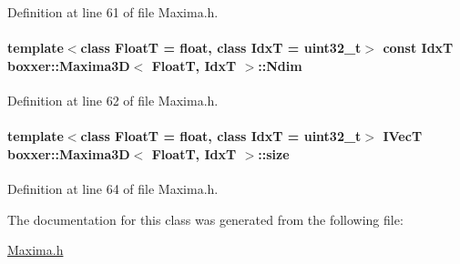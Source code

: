 Definition at line 61 of file Maxima.\+h.

\paragraph[{\texorpdfstring{Ndim}{Ndim}}]{\setlength{\rightskip}{0pt plus 5cm}template$<$class FloatT  = float, class IdxT  = uint32\+\_\+t$>$ const IdxT {\bf boxxer\+::\+Maxima3D}$<$ FloatT, IdxT $>$\+::Ndim\hspace{0.3cm}{\ttfamily [static]}}\hypertarget{classboxxer_1_1Maxima3D_ae446af4adb99b87f2211f3b4d83b6273}{}\label{classboxxer_1_1Maxima3D_ae446af4adb99b87f2211f3b4d83b6273}


Definition at line 62 of file Maxima.\+h.

\paragraph[{\texorpdfstring{size}{size}}]{\setlength{\rightskip}{0pt plus 5cm}template$<$class FloatT  = float, class IdxT  = uint32\+\_\+t$>$ {\bf I\+VecT} {\bf boxxer\+::\+Maxima3D}$<$ FloatT, IdxT $>$\+::size}\hypertarget{classboxxer_1_1Maxima3D_a71f401fe66798eeeb8581faa5f9e0927}{}\label{classboxxer_1_1Maxima3D_a71f401fe66798eeeb8581faa5f9e0927}


Definition at line 64 of file Maxima.\+h.



The documentation for this class was generated from the following file\+:\begin{DoxyCompactItemize}
\item 
\hyperlink{Maxima_8h}{Maxima.\+h}\end{DoxyCompactItemize}
